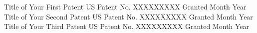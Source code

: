 \begin{patents}
  \cvpatent
    {Title of Your First Patent}
    {US Patent No. XXXXXXXXX}
    {Granted Month Year}
  \cvpatent
    {Title of Your Second Patent}
    {US Patent No. XXXXXXXXX}
    {Granted Month Year}
  \cvpatent
    {Title of Your Third Patent}
    {US Patent No. XXXXXXXXX}
    {Granted Month Year}
\end{patents}
